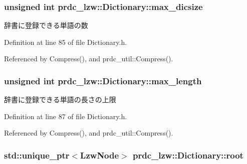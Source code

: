 \hypertarget{classprdc__lzw_1_1Dictionary_a27f3bda2d7baeb3c7a62db57de66ffb7}{
\subsubsection[{max\-\_\-dicsize}]{\setlength{\rightskip}{0pt plus 5cm}unsigned int prdc\-\_\-lzw\-::\-Dictionary\-::max\-\_\-dicsize}}\label{classprdc__lzw_1_1Dictionary_a27f3bda2d7baeb3c7a62db57de66ffb7}


辞書に登録できる単語の数 



Definition at line 85 of file Dictionary.\-h.



Referenced by Compress(), and prdc\-\_\-util\-::\-Compress().

\hypertarget{classprdc__lzw_1_1Dictionary_a1545e7874d133c508cd3e40f3c150b90}{
\subsubsection[{max\-\_\-length}]{\setlength{\rightskip}{0pt plus 5cm}unsigned int prdc\-\_\-lzw\-::\-Dictionary\-::max\-\_\-length}}\label{classprdc__lzw_1_1Dictionary_a1545e7874d133c508cd3e40f3c150b90}


辞書に登録できる単語の長さの上限 



Definition at line 87 of file Dictionary.\-h.



Referenced by Compress(), and prdc\-\_\-util\-::\-Compress().

\hypertarget{classprdc__lzw_1_1Dictionary_aeb30731d3e9ab5a4a6e7ae308e8e348b}{
\subsubsection[{root}]{\setlength{\rightskip}{0pt plus 5cm}std\-::unique\-\_\-ptr$<${\bf Lzw\-Node}$>$ prdc\-\_\-lzw\-::\-Dictionary\-::root\hspace{0.3cm}{\ttfamily [private]}}}\label{classprdc__lzw_1_1Dictionary_aeb30731d3e9ab5a4a6e7ae308e8e348b}


